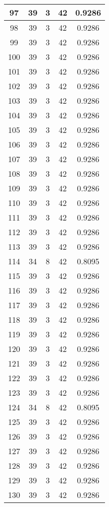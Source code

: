 \documentclass[letterpaper, 12pt]{article}
\begin{document}
\begin{longtable}{|c|c|c|c|c|}
\hline
97 & 39 & 3 & 42 & 0.9286 \\
\hline
98 & 39 & 3 & 42 & 0.9286 \\
\hline
99 & 39 & 3 & 42 & 0.9286 \\
\hline
100 & 39 & 3 & 42 & 0.9286 \\
\hline
101 & 39 & 3 & 42 & 0.9286 \\
\hline
102 & 39 & 3 & 42 & 0.9286 \\
\hline
103 & 39 & 3 & 42 & 0.9286 \\
\hline
104 & 39 & 3 & 42 & 0.9286 \\
\hline
105 & 39 & 3 & 42 & 0.9286 \\
\hline
106 & 39 & 3 & 42 & 0.9286 \\
\hline
107 & 39 & 3 & 42 & 0.9286 \\
\hline
108 & 39 & 3 & 42 & 0.9286 \\
\hline
109 & 39 & 3 & 42 & 0.9286 \\
\hline
110 & 39 & 3 & 42 & 0.9286 \\
\hline
111 & 39 & 3 & 42 & 0.9286 \\
\hline
112 & 39 & 3 & 42 & 0.9286 \\
\hline
113 & 39 & 3 & 42 & 0.9286 \\
\hline
114 & 34 & 8 & 42 & 0.8095 \\
\hline
115 & 39 & 3 & 42 & 0.9286 \\
\hline
116 & 39 & 3 & 42 & 0.9286 \\
\hline
117 & 39 & 3 & 42 & 0.9286 \\
\hline
118 & 39 & 3 & 42 & 0.9286 \\
\hline
119 & 39 & 3 & 42 & 0.9286 \\
\hline
120 & 39 & 3 & 42 & 0.9286 \\
\hline
121 & 39 & 3 & 42 & 0.9286 \\
\hline
122 & 39 & 3 & 42 & 0.9286 \\
\hline
123 & 39 & 3 & 42 & 0.9286 \\
\hline
124 & 34 & 8 & 42 & 0.8095 \\
\hline
125 & 39 & 3 & 42 & 0.9286 \\
\hline
126 & 39 & 3 & 42 & 0.9286 \\
\hline
127 & 39 & 3 & 42 & 0.9286 \\
\hline
128 & 39 & 3 & 42 & 0.9286 \\
\hline
129 & 39 & 3 & 42 & 0.9286 \\
\hline
130 & 39 & 3 & 42 & 0.9286 \\

\end{longtable}
\end{document}
